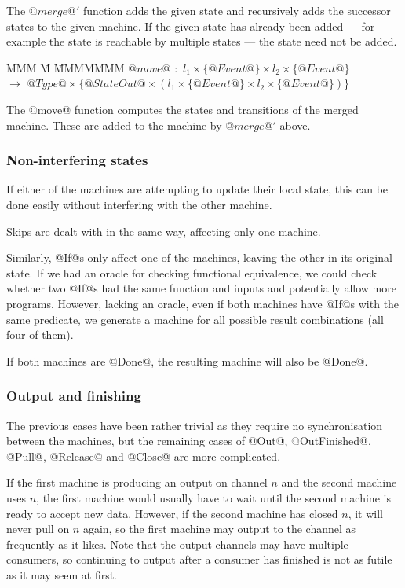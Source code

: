 The $@merge@'$ function adds the given state and recursively adds the successor states to the given machine.
If the given state has already been added --- for example the state is reachable by multiple states --- the state need not be added.

\begin{tabbing}
MMM \= M \= MMMMMMM\kill
$@move@$ \> $:$ \> $l_1 \times \{@Event@\} \times l_2 \times \{@Event@\}$ \\
           \> $\to$ \> $@Type@ \times \{@StateOut@ \times (l_1 \times \{@Event@\} \times l_2 \times \{@Event@\})\}$ \\
\end{tabbing}

The @move@ function computes the states and transitions of the merged machine.
These are added to the machine by $@merge@'$ above.




\subsubsection{Non-interfering states}
If either of the machines are attempting to update their local state, this can be done easily without interfering with the other machine.

Skips are dealt with in the same way, affecting only one machine.

Similarly, @If@s only affect one of the machines, leaving the other in its original state.
If we had an oracle for checking functional equivalence, we could check whether two @If@s had the same function and inputs and potentially allow more programs.
However, lacking an oracle, even if both machines have @If@s with the same predicate, we generate a machine for all possible result combinations (all four of them).

If both machines are @Done@, the resulting machine will also be @Done@.

\subsubsection{Output and finishing}
The previous cases have been rather trivial as they require no synchronisation between the machines, but the remaining cases of @Out@, @OutFinished@, @Pull@, @Release@ and @Close@ are more complicated.

If the first machine is producing an output on channel $n$ and the second machine uses $n$, the first machine would usually have to wait until the second machine is ready to accept new data.
However, if the second machine has closed $n$, it will never pull on $n$ again, so the first machine may output to the channel as frequently as it likes.
Note that the output channels may have multiple consumers, so continuing to output after a consumer has finished is not as futile as it may seem at first.

